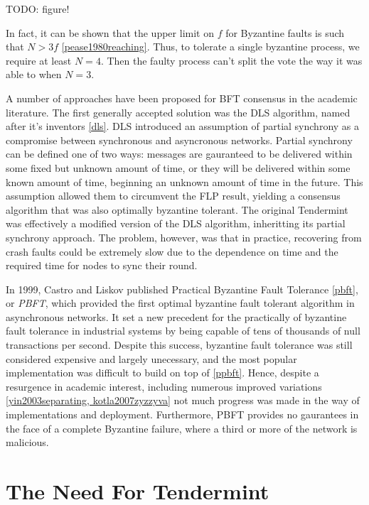 TODO: figure!

In fact, it can be shown that the upper limit on $f$ for Byzantine faults is such that $N > 3f$ \ref{pease1980reaching}.
Thus, to tolerate a single byzantine process, we require at least $N=4$. 
Then the faulty process can't split the vote the way it was able to when $N=3$.

A number of approaches have been proposed for BFT consensus in the academic literature.
The first generally accepted solution was the DLS algorithm, named after it's inventors \ref{dls}.
DLS introduced an assumption of partial synchrony as a compromise between synchronous and asyncronous networks.
Partial synchrony can be defined one of two ways: 
messages are gauranteed to be delivered within some fixed but unknown amount of time,
or they will be delivered within some known amount of time, beginning an unknown amount of time in the future.
This assumption allowed them to circumvent the FLP result, yielding a consensus algorithm that was also optimally byzantine tolerant.
The original Tendermint was effectively a modified version of the DLS algorithm, inheritting its partial synchrony approach.
The problem, however, was that in practice, recovering from crash faults could be extremely slow due to the dependence on time and the required time for nodes to sync their round.

In 1999, Castro and Liskov published Practical Byzantine Fault Tolerance \ref{pbft}, or \emph{PBFT}, 
which provided the first optimal byzantine fault tolerant algorithm in asynchronous networks.
It set a new precedent for the practically of byzantine fault tolerance in industrial systems by being capable of 
tens of thousands of null transactions per second.
Despite this success, byzantine fault tolerance was still considered expensive and largely unecessary, 
and the most popular implementation was difficult to build on top of \ref{ppbft}.
Hence, despite a resurgence in academic interest, including numerous improved variations \ref{yin2003separating, kotla2007zyzzyva}
not much progress was made in the way of implementations and deployment.
Furthermore, PBFT provides no gaurantees in the face of a complete Byzantine failure, where a third or more of the network is malicious.

\section{The Need For Tendermint}

